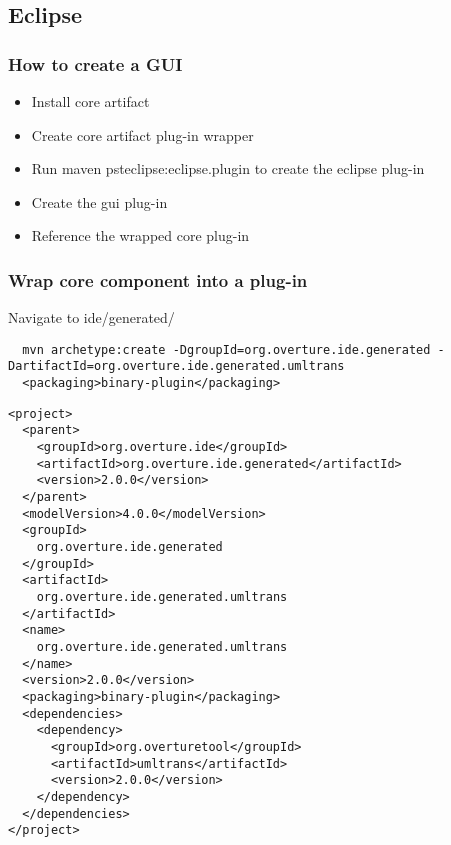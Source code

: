 \subsection{Eclipse}


\frame
{
  \frametitle{How to create a GUI}
\begin{itemize}
	\item Install core artifact
	\item Create core artifact plug-in wrapper
	\item Run maven psteclipse:eclipse.plugin to create the eclipse plug-in
	\item Create the gui plug-in
	\item Reference the wrapped core plug-in
\end{itemize}


}

\begin{frame}[fragile]
  \frametitle{Wrap core component into a plug-in}

Navigate to ide/generated/
  \begin{lstlisting}
  mvn archetype:create -DgroupId=org.overture.ide.generated -DartifactId=org.overture.ide.generated.umltrans 
  <packaging>binary-plugin</packaging>
  \end{lstlisting}

\begin{lstlisting}
<project>
  <parent>
    <groupId>org.overture.ide</groupId>
    <artifactId>org.overture.ide.generated</artifactId>
    <version>2.0.0</version>
  </parent>
  <modelVersion>4.0.0</modelVersion>
  <groupId>
    org.overture.ide.generated
  </groupId>
  <artifactId>
    org.overture.ide.generated.umltrans
  </artifactId>
  <name>
    org.overture.ide.generated.umltrans
  </name>
  <version>2.0.0</version>
  <packaging>binary-plugin</packaging>
  <dependencies>
    <dependency>
      <groupId>org.overturetool</groupId>
      <artifactId>umltrans</artifactId>
      <version>2.0.0</version>
    </dependency>
  </dependencies>
</project>
\end{lstlisting}
\end{frame}



